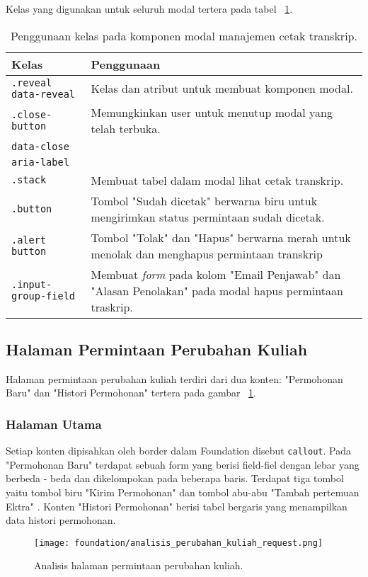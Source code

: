 \noindent Kelas yang digunakan untuk seluruh modal tertera pada tabel ~\ref{table:analisisModalManajemenCetakTranskrip}.

\begin{table}[H]
	\centering
	\caption{Penggunaan kelas pada komponen modal manajemen cetak transkrip.}
	\begin{tabularx}{\textwidth}{lX}
		\toprule
		Kelas     & Penggunaan \\
		\midrule
		\texttt{.reveal data-reveal} & Kelas dan atribut untuk membuat komponen modal.\\
		\texttt{.close-button}  & Memungkinkan user untuk menutup modal yang telah terbuka.\\
		\texttt{data-close} & \\
		\texttt{aria-label} & \\
		\texttt{.stack} & Membuat tabel dalam modal lihat cetak transkrip.\\
		\texttt{.button} & Tombol "Sudah dicetak" berwarna biru untuk mengirimkan status permintaan sudah dicetak. \\
		\texttt{.alert button} & Tombol "Tolak" dan "Hapus" berwarna merah untuk menolak dan menghapus permintaan transkrip\\
		\texttt{.input-group-field} & Membuat  \textit{form} pada kolom "Email Penjawab" dan "Alasan Penolakan" pada modal hapus permintaan traskrip.\\
		\bottomrule
	\end{tabularx}%
	\label{table:analisisModalManajemenCetakTranskrip}
\end{table}%

\subsection{Halaman Permintaan Perubahan Kuliah}
Halaman permintaan perubahan kuliah terdiri dari dua konten: "Permohonan Baru" dan "Histori Permohonan" tertera pada gambar ~\ref{fig:analisisPermintaanPerubahanKuliah}. 

\subsubsection{Halaman Utama}
Setiap konten dipisahkan oleh border dalam Foundation disebut \texttt{callout}. Pada "Permohonan Baru" terdapat sebuah form yang berisi field-fiel dengan lebar yang berbeda - beda dan dikelompokan pada beberapa baris. Terdapat tiga tombol yaitu tombol biru "Kirim Permohonan" dan tombol abu-abu "Tambah pertemuan Ektra" .
Konten "Histori Permohonan" berisi tabel bergaris yang menampilkan data histori permohonan. 
\begin{figure} [H]
	\centering  
	\texttt{[image: foundation/analisis\_perubahan\_kuliah\_request.png]}
	\caption{Analisis halaman permintaan perubahan kuliah.}
	\label{fig:analisisPermintaanPerubahanKuliah}
\end{figure}

